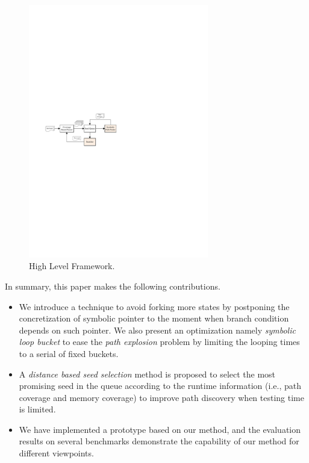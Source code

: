\begin{figure}
\begin{center}
\includegraphics[width=0.7\textwidth]{figures/framework.pdf} 
\caption{High Level Framework.}\label{Framework}
\end{center}
\end{figure}


In summary, this paper makes the following contributions.
\begin{itemize}
\item We introduce a technique to avoid forking more states by postponing the concretization of symbolic pointer to the moment when branch condition depends on such pointer.  
 We also present an optimization namely \emph{symbolic loop bucket} to ease the \textit{path explosion} problem by limiting the looping times to a serial of fixed buckets.

\item A \emph{distance based seed selection} method is proposed to select the most promising seed 
 in the queue according to the runtime information (i.e., path coverage and memory coverage) to improve path discovery when testing time is limited. 

\item We have implemented a prototype based on our method, 
 and the evaluation results on several benchmarks demonstrate the capability of our method for different viewpoints.
\end{itemize}


